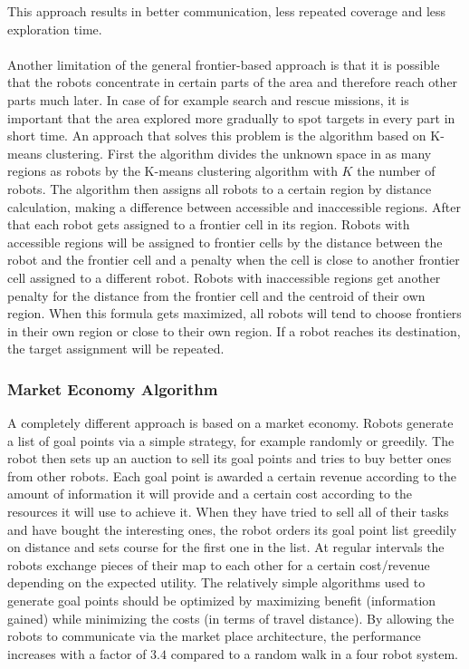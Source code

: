	This approach results in better communication, less repeated coverage and less exploration time. \cite{sheng2006distributed}\\
	\\
	Another limitation of the general frontier-based approach is that it is possible that the robots concentrate in certain parts of the area and therefore reach other parts much later.
	In case of for example search and rescue missions, it is important that the area explored more gradually to spot targets in every part in short time. 
	An approach that solves this problem is the algorithm based on K-means clustering.
	First the algorithm divides the unknown space in as many regions as robots by the K-means clustering algorithm with $K$ the number of robots.
	The algorithm then assigns all robots to a certain region by distance calculation, making a difference between accessible and inaccessible regions.
	After that each robot gets assigned to a frontier cell in its region.
	Robots with accessible regions will be assigned to frontier cells by the distance between the robot and the frontier cell and a penalty when the cell is close to another frontier cell assigned to a different robot.
	Robots with inaccessible regions get another penalty for the distance from the frontier cell and the centroid of their own region.
	When this formula gets maximized, all robots will tend to choose frontiers in their own region or close to their own region.
	If a robot reaches its destination, the target assignment will be repeated. \cite{solanas2004coordinated}

	\subsubsection{Market Economy Algorithm}
	A completely different approach is based on a market economy.
	Robots generate a list of goal points via a simple strategy, for example randomly or greedily.
	The robot then sets up an auction to sell its goal points and tries to buy better ones from other robots.
	Each goal point is awarded a certain revenue according to the amount of information it will provide and a certain cost according to the resources it will use to achieve it.
	When they have tried to sell all of their tasks and have bought the interesting ones, the robot orders its goal point list greedily on distance and sets course for the first one in the list.
	At regular intervals the robots exchange pieces of their map to each other for a certain cost/revenue depending on the expected utility.
	The relatively simple algorithms used to generate goal points should be optimized by maximizing benefit (information gained) while minimizing the costs (in terms of travel distance).
	By allowing the robots to communicate via the market place architecture, the performance increases with a factor of $3.4$ compared to a random walk in a four robot system. \cite{zlot2002multi}

